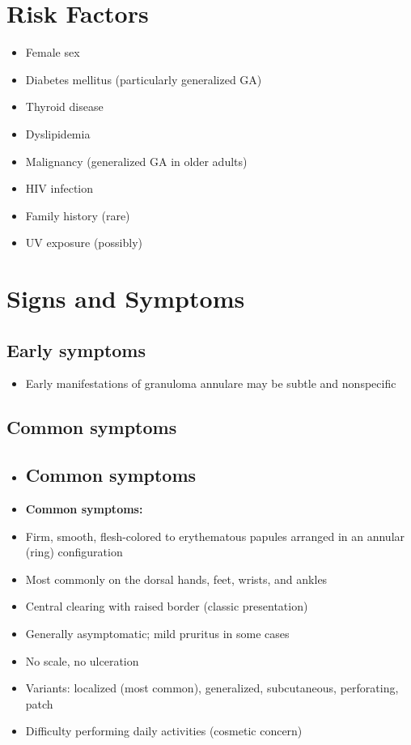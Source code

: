 \section{Risk Factors}

\begin{itemize}[noitemsep]
  \item Female sex
  \item Diabetes mellitus (particularly generalized GA)
  \item Thyroid disease
  \item Dyslipidemia
  \item Malignancy (generalized GA in older adults)
  \item HIV infection
  \item Family history (rare)
  \item UV exposure (possibly)
\end{itemize}

\section{Signs and Symptoms}

\subsection{Early symptoms}
\begin{itemize}[noitemsep]
  \item Early manifestations of granuloma annulare may be subtle and nonspecific
\end{itemize}

\subsection{Common symptoms}
\begin{itemize}[noitemsep]
  \item \subsection{Common symptoms}
  \item \textbf{Common symptoms:}
  \item Firm, smooth, flesh-colored to erythematous papules arranged in an annular (ring) configuration
  \item Most commonly on the dorsal hands, feet, wrists, and ankles
  \item Central clearing with raised border (classic presentation)
  \item Generally asymptomatic; mild pruritus in some cases
  \item No scale, no ulceration
  \item Variants: localized (most common), generalized, subcutaneous, perforating, patch
  \item Difficulty performing daily activities (cosmetic concern)
\end{itemize}

